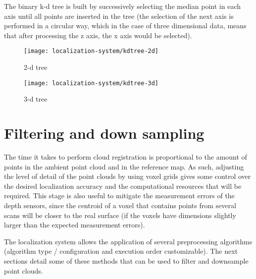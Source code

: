 The binary k-d tree is built by successively selecting the median point in each axis until all points are inserted in the tree (the selection of the next axis is performed in a circular way, which in the case of three dimensional data, means that after processing the z axis, the x axis would be selected).

\begin{savenotes}
\begin{figure}[H]
	\centering
	\begin{minipage}[h]{0.495\textwidth}
		\centering
		\texttt{[image: localization-system/kdtree-2d]}
		\caption[2-d tree]{2-d tree\protect\footnotemark}
		\label{fig:localization_system_2d-tree}
	\end{minipage}\hfill
	\begin{minipage}[h]{0.495\textwidth}
		\centering
		\texttt{[image: localization-system/kdtree-3d]}
		\caption[3-d tree]{3-d tree\protect\footnotemark}
		\label{fig:localization_system_3d-tree}
	\end{minipage}
\end{figure}
\end{savenotes}



\section{Filtering and down sampling}

The time it takes to perform cloud registration is proportional to the amount of points in the ambient point cloud and in the reference map. As such, adjusting the level of detail of the point clouds by using voxel grids gives some control over the desired localization accuracy and the computational resources that will be required. This stage is also useful to mitigate the measurement errors of the depth sensors, since the centroid of a voxel that contains points from several scans will be closer to the real surface (if the voxels have dimensions slightly larger than the expected measurement errors).

The localization system allows the application of several preprocessing algorithms (algorithm type / configuration and execution order customizable). The next sections detail some of these methods that can be used to filter and downsample point clouds.


